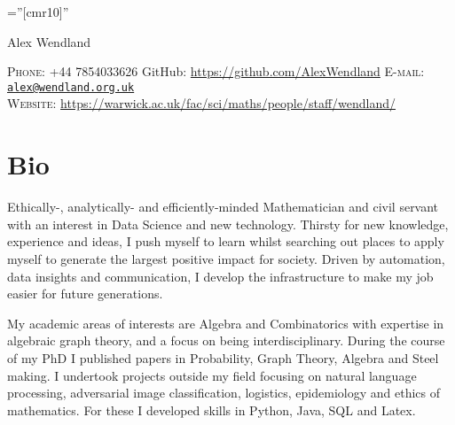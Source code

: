 \documentclass[a4paper,10pt]{article}
\begin{document}

\pagestyle{empty} %

\font\fb=''[cmr10]'' %

\par{\centering
		{\Huge Alex Wendland
	}\bigskip\par}
\begin{center}
	\textsc{Phone:} +44 7854033626 \hspace{1cm} GitHub: \href{https://github.com/AlexWendland}{https://github.com/AlexWendland} \hspace{1cm} \textsc{E-mail:} \href{mailto:alex@wendland.org.uk}{\texttt{alex@wendland.org.uk}}\\
	\textsc{Website:} \href{https://warwick.ac.uk/fac/sci/maths/people/staff/wendland/}{https://warwick.ac.uk/fac/sci/maths/people/staff/wendland/}
\end{center}


\section{Bio}
Ethically-, analytically- and efficiently-minded Mathematician and civil servant with an interest in Data Science and new technology. Thirsty for new knowledge, experience and ideas, I push myself to learn whilst searching out places to apply myself to generate the largest positive impact for society. Driven by automation, data insights and communication, I develop the infrastructure to make my job easier for future generations.

My academic areas of interests are Algebra and Combinatorics with expertise in algebraic graph theory, and a focus on being interdisciplinary. During the course of my PhD I published papers in Probability, Graph Theory, Algebra and Steel making. I undertook projects outside my field focusing on natural language processing, adversarial image classification, logistics, epidemiology and ethics of mathematics. For these I developed skills in Python, Java, SQL and Latex.
\end{document}
